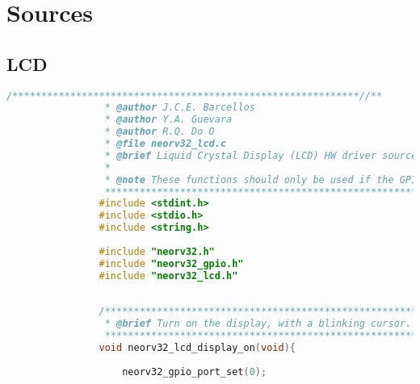 %
%
%
%
%


\chapter{Sources}

        \section{LCD}\label{.c:lcd}
            \begin{lstlisting}[style=mystyle_c, language=c, breaklines]
                /************************************************************//**
                 * @author J.C.E. Barcellos
                 * @author Y.A. Guevara
                 * @author R.Q. Do O
                 * @file neorv32_lcd.c
                 * @brief Liquid Crystal Display (LCD) HW driver source file.
                 *
                 * @note These functions should only be used if the GPIO unit was synthesized (IO_GPIO_EN = true).
                 ***************************************************************/
                #include <stdint.h>
                #include <stdio.h>
                #include <string.h>
                
                #include "neorv32.h"
                #include "neorv32_gpio.h"
                #include "neorv32_lcd.h"
                
                
                /************************************************************//**
                 * @brief Turn on the display, with a blinking cursor.
                 ***************************************************************/
                void neorv32_lcd_display_on(void){
                    
                    neorv32_gpio_port_set(0);
                

\end{lstlisting}

